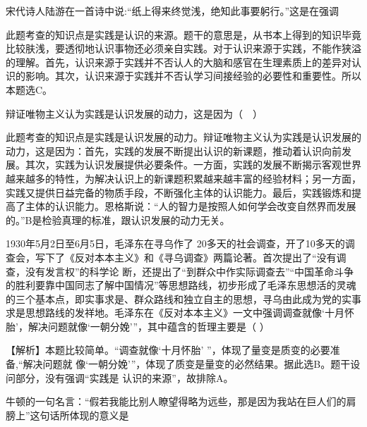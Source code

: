 \question 宋代诗人陆游在一首诗中说:``纸上得来终觉浅，绝知此事要躬行。''这是在强调
\par{}
\begin{solution}此题考查的知识点是实践是认识的来源。题干的意思是，从书本上得到的知识毕竟比较肤浅，要透彻地认识事物还必须亲自实践。对于认识来源于实践，不能作狭溢的理解。首先，认识来源于实践并不否认人的大脑和感官在生理素质上的差异对认识的影响。其次，认识来源于实践并不否认学习间接经验的必要性和重要性。所以本题选C。
\end{solution}
\question 辩证唯物主义认为实践是认识发展的动力，这是因为（　）
\par{}
\begin{solution}此题考查的知识点是实践是认识发展的动力。辩证唯物主义认为实践是认识发展的动力，这是因为：首先，实践的发展不断提出认识的新课题，推动着认识向前发展。其次，实践为认识发展提供必要条件。一方面，实践的发展不断揭示客观世界越来越多的特性，为解决认识上的新课题积累越来越丰富的经验材料；另一方面，实践又提供日益完备的物质手段，不断强化主体的认识能力。最后，实践锻炼和提高了主体的认识能力。恩格斯说：``人的智力是按照人如何学会改变自然界而发展的。''B是检验真理的标准，跟认识发展的动力无关。
\end{solution}
\question 1930年5月2日至6月5日，毛泽东在寻乌作了
20多天的社会调查，开了10多天的调查会，写下了《反对本本主义》和《寻乌调查》两篇论著。首次提出了``没有调查，没有发言权''的科学论
断，还提出了``到群众中作实际调查去''``中国革命斗争的胜利要靠中国同志了解中国情况''等思想路线，初步形成了毛泽东思想活的灵魂的三个基本点，即实事求是、群众路线和独立自主的思想，寻乌由此成为党的实事求是思想路线的发祥地。毛泽东在《反对本本主义》一文中强调调查就像`十月怀胎'，解决问题就像`一朝分娩'''，其中蕴含的哲理主要是（
）
\par{}
\begin{solution}【解析】本题比较简单。``调查就像`十月怀胎'
''，体现了量变是质变的必要准备,``解决问题就
像`一朝分娩'''，体现了质变是量变的必然结果。据此选B。题干设问部分，没有强调``实践是
认识的来源''，故排除A。
\end{solution}
\question 牛顿的一句名言：``假若我能比别人瞭望得略为远些，那是因为我站在巨人们的肩膀上''这句话所体现的意义是
